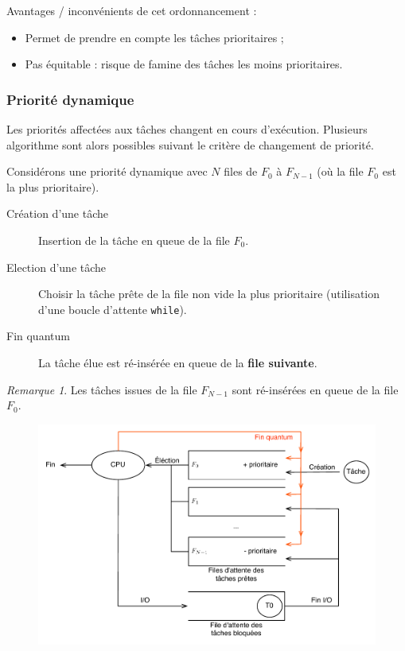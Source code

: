 \documentclass[11pt,english,french]{scrreprt}
\theoremstyle{remark}
\newtheorem*{rem*}{Remarque}
\theoremstyle{definition}
\newcommand*\Pitem{%
  \item[\color{green}\scalebox{0.9}{\textbullet}]}
\newcommand*\Citem{%
  \item[\color{red}\scalebox{0.9}{\textbullet}]}
\begin{document}
Avantages / inconvénients de cet ordonnancement :\begin{itemize}
	\Pitem Permet de prendre en compte les tâches prioritaires ;
	\Citem Pas équitable : risque de famine des tâches les moins prioritaires.
\end{itemize}

\subsubsection{Priorité dynamique} %
Les priorités affectées aux tâches changent en cours d'exécution. Plusieurs algorithme sont alors possibles suivant le critère de changement de priorité.

Considérons une priorité dynamique avec $N$ files de $F_0$ à $F_{N-1}$ (où la file $F_0$ est la plus prioritaire).

\begin{description}
	\item[Création d'une tâche] Insertion de la tâche en queue de la file $F_0$.
	\item[Election d'une tâche] Choisir la tâche prête de la file non vide la plus prioritaire (utilisation d'une boucle d'attente \lstinline!while!).
	\item[Fin quantum] La tâche élue est ré-insérée en queue de la \textbf{file suivante}.
\end{description}

\begin{rem*}
	Les tâches issues de la file $F_{N-1}$ sont ré-insérées en queue de la file $F_0$.
\end{rem*}

\begin{figure}[h!]
	\center
	\vspace{-10pt}
	\includegraphics[scale=.65]{img/priorite-dynamique}
	\vspace{-10pt}
\end{figure}
\end{document}
